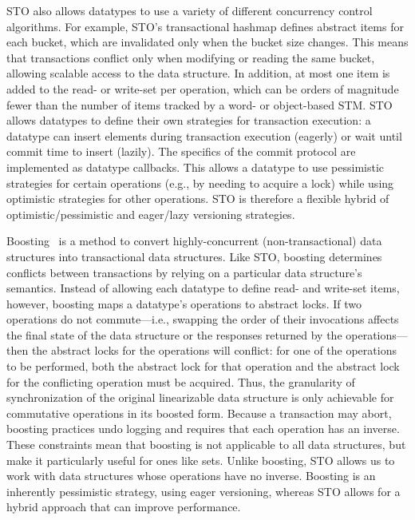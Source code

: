 STO also allows datatypes to use a variety of different concurrency control algorithms. For example, STO's transactional hashmap defines abstract items for each bucket, which are invalidated only when the bucket size changes. This means that transactions conflict only when modifying or reading the same bucket, allowing scalable access to the data structure. In addition, at most one item is added to the read- or write-set per operation, which can be orders of magnitude fewer than the number of items tracked by a word- or object-based STM. STO allows datatypes to define their own strategies for transaction execution: a datatype can insert elements during transaction execution (eagerly) or wait until commit time to insert (lazily). The specifics of the commit protocol are implemented as datatype callbacks. This allows a datatype to use pessimistic strategies for certain operations (e.g., by needing to acquire a lock) while using optimistic strategies for other operations. STO is therefore a flexible hybrid of optimistic/pessimistic and eager/lazy versioning strategies.

Boosting~\cite{boost} is a method to convert highly-concurrent (non-transactional) data structures into transactional data structures. Like STO, boosting determines conflicts between transactions by relying on a particular data structure's semantics. Instead of allowing each datatype to define read- and write-set items, however, boosting maps a datatype's operations to abstract locks. If two operations do not commute---i.e., swapping the order of their invocations affects the final state of the data structure or the responses returned by the operations---then the abstract locks for the operations will conflict: for one of the operations to be performed, both the abstract lock for that operation and the abstract lock for the conflicting operation must be acquired.
Thus, the granularity of synchronization of the original linearizable data structure is only achievable for commutative operations in its boosted form. Because a transaction may abort, boosting practices undo logging and requires that each operation has an inverse. These constraints mean that boosting is not applicable to all data structures, but make it particularly useful for ones like sets. Unlike boosting, STO allows us to work with data structures whose operations have no inverse. Boosting is an inherently pessimistic strategy, using eager versioning, whereas STO allows for a hybrid approach that can improve performance.

